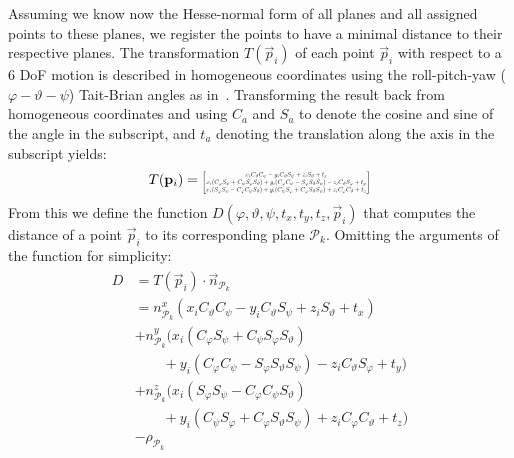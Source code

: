 Assuming we know now the Hesse-normal form of all planes and all assigned points to these planes, we register the points to have a minimal distance to their respective planes.
The transformation $T(\vec{p}_i)$ of each point $\vec{p}_i$ with respect to a 6 DoF motion is described in homogeneous coordinates using the roll-pitch-yaw ($\varphi-\vartheta-\psi$) Tait-Brian angles as in~\cite{diebel2006representing}. Transforming the result back from homogeneous coordinates and using $C_a$ and $S_a$ to denote the cosine and sine of the angle in the subscript, and $t_a$ denoting the translation along the axis in the subscript yields:
\begin{align}
	T(\vec{p}_i)  =
    \resizebox{0.35\textwidth}{!}{$\begin{bmatrix}
        x_i C_\vartheta C_\psi - y_iC_\vartheta S_\psi + z_i S_\vartheta + t_x\\
        x_i (C_\varphi S_\psi + C_\psi S_\varphi S_\vartheta) + y_i(C_\varphi C_\psi - S_\varphi S_\vartheta S_\psi) - z_i C_\vartheta S_\varphi + t_y\\
        x_i(S_\varphi S_\psi - C_\varphi C_\psi S_\vartheta) + y_i(C_\psi S_\varphi + C_\varphi S_\vartheta S_\psi) + z_i C_\varphi C_\vartheta + t_z
    \end{bmatrix}$}
\end{align}
From this we define the function $D(\varphi,\vartheta,\psi,t_x,t_y,t_z, \vec{p}_i)$ that computes the distance of a point $\vec{p}_i$ to its corresponding plane $\mathcal{P}_k$.
Omitting the arguments of the function for simplicity:
\begin{align}
\begin{aligned}
    D &= T(\vec{p}_i) \cdot \vec{n}_{\mathcal{P}_k} \\
      &= n_{\mathcal{P}_k}^x (x_i C_\vartheta C_\psi - y_iC_\vartheta S_\psi + z_i S_\vartheta + t_x)\\
       &+ n_{\mathcal{P}_k}^y(x_i (C_\varphi S_\psi + C_\psi S_\varphi S_\vartheta)\\
       &\qquad+ y_i(C_\varphi C_\psi - S_\varphi S_\vartheta S_\psi) - z_i C_\vartheta S_\varphi + t_y)\\
       &+ n_{\mathcal{P}_k}^z (x_i(S_\varphi S_\psi - C_\varphi C_\psi S_\vartheta)\\
       &\qquad+ y_i(C_\psi S_\varphi + C_\varphi S_\vartheta S_\psi) + z_i C_\varphi C_\vartheta + t_z)\\
       &- \rho_{\mathcal{P}_k}
\end{aligned}
\end{align}

